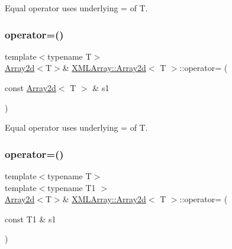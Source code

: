Equal operator uses underlying = of T. 

\mbox{\label{classXMLArray_1_1Array2d_a9fafd7ae228834d56b08fb5b1485eba4}} 
\subsubsection{\texorpdfstring{operator=()}{operator=()}\hspace{0.1cm}{\footnotesize\ttfamily [2/4]}}
{\footnotesize\ttfamily template$<$typename T$>$ \\
\mbox{\hyperlink{classXMLArray_1_1Array2d}{Array2d}}$<$T$>$\& \mbox{\hyperlink{classXMLArray_1_1Array2d}{X\+M\+L\+Array\+::\+Array2d}}$<$ T $>$\+::operator= (\begin{DoxyParamCaption}\item[{const \mbox{\hyperlink{classXMLArray_1_1Array2d}{Array2d}}$<$ T $>$ \&}]{s1 }\end{DoxyParamCaption})\hspace{0.3cm}{\ttfamily [inline]}}



Equal operator uses underlying = of T. 

\mbox{\label{classXMLArray_1_1Array2d_a2ac560b13ec78975a0cab0b2dcbfe72f}} 
\subsubsection{\texorpdfstring{operator=()}{operator=()}\hspace{0.1cm}{\footnotesize\ttfamily [3/4]}}
{\footnotesize\ttfamily template$<$typename T$>$ \\
template$<$typename T1 $>$ \\
\mbox{\hyperlink{classXMLArray_1_1Array2d}{Array2d}}$<$T$>$\& \mbox{\hyperlink{classXMLArray_1_1Array2d}{X\+M\+L\+Array\+::\+Array2d}}$<$ T $>$\+::operator= (\begin{DoxyParamCaption}\item[{const T1 \&}]{s1 }\end{DoxyParamCaption})\hspace{0.3cm}{\ttfamily [inline]}}



